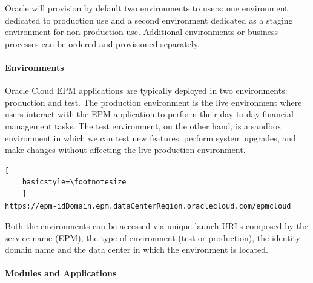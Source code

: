 \documentclass[12pt,a4paper,openright,twoside]{book}
\begin{document}
Oracle will provision by default two environments to users: one environment dedicated to production use and a second environment dedicated as a staging environment for non-production use.
%
Additional environments or business processes can be ordered and provisioned separately.

\paragraph{Environments}

Oracle Cloud EPM applications are typically deployed in two environments: production and test.
%
The production environment is the live environment where users interact with the EPM application to perform their day-to-day financial management tasks.
%
The test environment, on the other hand, is a sandbox environment in which we can test new features, perform system upgrades, and make changes without affecting the live production environment. \\

\begin{lstlisting}[
    basicstyle=\footnotesize
    ]
https://epm-idDomain.epm.dataCenterRegion.oraclecloud.com/epmcloud
\end{lstlisting}

Both the environments can be accessed via unique launch URLs composed by the service name (EPM), the type of environment (test or production), the identity domain name and the data center in which the environment is located.

\paragraph{Modules and Applications}
\end{document}
